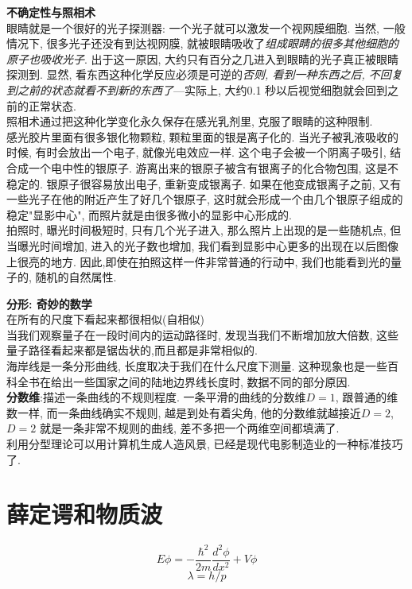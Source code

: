 \textbf{不确定性与照相术}\\
眼睛就是一个很好的光子探测器: 一个光子就可以激发一个视网膜细胞. 当然, 一般情况下, 很多光子还没有到达视网膜, 就被眼睛吸收了\textit{组成眼睛的很多其他细胞的原子也吸收光子}.
出于这一原因, 大约只有百分之几进入到眼睛的光子真正被眼睛探测到. 显然, 看东西这种化学反应必须是可逆的\textit{否则, 看到一种东西之后, 不回复到之前的状态就看不到新的东西了}---实际上, 大约0.1 秒以后视觉细胞就会回到之前的正常状态. \\
照相术通过把这种化学变化永久保存在感光乳剂里, 克服了眼睛的这种限制.\\
感光胶片里面有很多银化物颗粒, 颗粒里面的银是离子化的. 当光子被乳液吸收的时候, 有时会放出一个电子, 就像光电效应一样. 这个电子会被一个阴离子吸引, 结合成一个电中性的银原子.
游离出来的银原子被含有银离子的化合物包围, 这是不稳定的. 银原子很容易放出电子, 重新变成银离子. 如果在他变成银离子之前, 又有一些光子在他的附近产生了好几个银原子, 这时就会形成一个由几个银原子组成的稳定"显影中心", 而照片就是由很多微小的显影中心形成的.\\
拍照时, 曝光时间极短时, 只有几个光子进入, 那么照片上出现的是一些随机点, 但当曝光时间增加, 进入的光子数也增加, 我们看到显影中心更多的出现在以后图像上很亮的地方. 因此,即使在拍照这样一件非常普通的行动中, 我们也能看到光的量子的, 随机的自然属性.
\bigskip

\textbf{分形: 奇妙的数学}\\
在所有的尺度下看起来都很相似(自相似)\\
当我们观察量子在一段时间内的运动路径时, 发现当我们不断增加放大倍数, 这些量子路径看起来都是锯齿状的,而且都是非常相似的.\\
海岸线是一条分形曲线, 长度取决于我们在什么尺度下测量. 这种现象也是一些百科全书在给出一些国家之间的陆地边界线长度时, 数据不同的部分原因.\\
\textbf{分数维}:描述一条曲线的不规则程度. 一条平滑的曲线的分数维$D=1$, 跟普通的维数一样, 而一条曲线确实不规则, 越是到处有着尖角, 他的分数维就越接近$D=2$, $D=2$ 就是一条非常不规则的曲线, 差不多把一个两维空间都填满了.\\
利用分型理论可以用计算机生成人造风景, 已经是现代电影制造业的一种标准技巧了.

\section{薛定谔和物质波}
$$
E\phi = -\dfrac{\hbar^2}{2m} \frac{d^2 \phi}{dx^2} + V\phi
$$
$$
\lambda = h/p
$$

